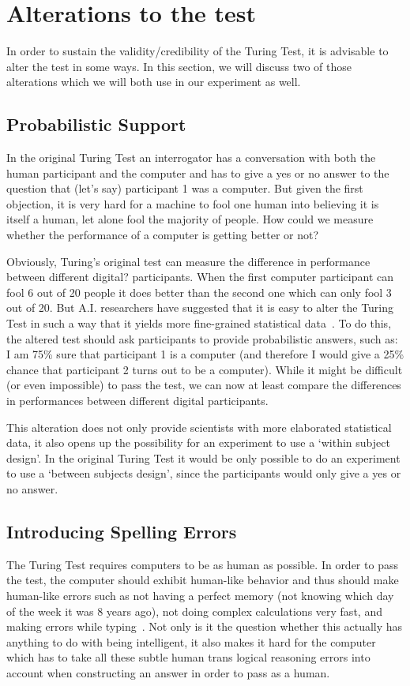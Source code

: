 \section{Alterations to the test}
In order to sustain the validity/credibility of the Turing Test, it is advisable to alter the test in some ways. In this section, we will discuss two of those alterations which we will both use in our experiment as well.

\subsection{Probabilistic Support}
In the original Turing Test an interrogator has a conversation with both the human participant and the computer and has to give a yes or no answer to the question that (let’s say) participant 1 was a computer. But given the first objection, it is very hard for a machine to fool one human into believing it is itself a human, let alone fool the majority of people. How could we measure whether the performance of a computer is getting better or not?

Obviously, Turing’s original test can measure the difference in performance between different digital? participants. When the first computer participant can fool 6 out of 20 people it does better than the second one which can only fool 3 out of 20. But A.I. researchers have suggested that it is easy to alter the Turing Test in such a way that it yields more fine-grained statistical data~\cite{shieber2007turing}. To do this, the altered test should ask participants to provide probabilistic answers, such as: I am 75\% sure that participant 1 is a computer (and therefore I would give a 25\% chance that participant 2 turns out to be a computer). While it might be difficult (or even impossible) to pass the test, we can now at least compare the differences in performances between different digital participants.

This alteration does not only provide scientists with more elaborated statistical data, it also opens up the possibility for an experiment to use a ‘within subject design’. In the original Turing Test it would be only possible to do an experiment to use a ‘between subjects design’, since the participants would only give a yes or no answer.


\subsection{Introducing Spelling Errors}
The Turing Test requires computers to be as human as possible. In order to pass the test, the computer should exhibit human-like behavior and thus should make human-like errors such as not having a perfect memory (not knowing which day of the week it was 8 years ago), not doing complex calculations very fast, and making errors while typing~\cite{epstein2009parsing}. Not only is it the question whether this actually has anything to do with being intelligent, it also makes it hard for the computer which has to take all these subtle human trans logical reasoning errors into account when constructing an answer in order to pass as a human.

